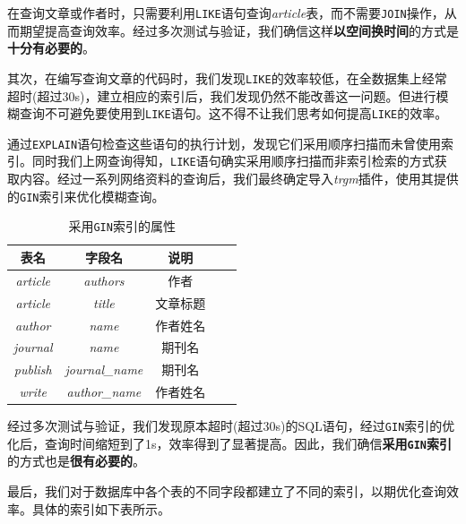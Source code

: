 \documentclass[UTF8,openany]{ctexbook}
\begin{document}
在查询文章或作者时，只需要利用\texttt{LIKE}语句查询\textit{article}表，而不需要\texttt{JOIN}操作，从而期望提高查询效率。经过多次测试与验证，我们确信这样\textbf{以空间换时间}的方式是\textbf{十分有必要的}。

其次，在编写查询文章的代码时，我们发现\texttt{LIKE}的效率较低，在全数据集上经常超时(超过30s)，建立相应的索引后，我们发现仍然不能改善这一问题。但进行模糊查询不可避免要使用到\texttt{LIKE}语句。这不得不让我们思考如何提高\texttt{LIKE}的效率。

通过\texttt{EXPLAIN}语句检查这些语句的执行计划，发现它们采用顺序扫描而未曾使用索引。同时我们上网查询得知，\texttt{LIKE}语句确实采用顺序扫描而非索引检索的方式获取内容。经过一系列网络资料的查询后，我们最终确定导入\textit{trgm}插件，使用其提供的\texttt{GIN}索引来优化模糊查询。

\begin{table}[H]
    \centering
    \begin{tabular}{|c|c|c|c|c|}
        \hline
        \textbf{表名} & \textbf{字段名} & \textbf{说明} \\
        \hline
        \textit{article} & \textit{authors} & 作者 \\
        \hline
        \textit{article} & \textit{title} & 文章标题 \\
        \hline
        \textit{author} & \textit{name} & 作者姓名 \\
        \hline
        \textit{journal} & \textit{name} & 期刊名 \\
        \hline
        \textit{publish} & \textit{journal\_name} & 期刊名 \\
        \hline
        \textit{write} & \textit{author\_name} & 作者姓名 \\
        \hline
    \end{tabular}
    \caption{采用\texttt{GIN}索引的属性}
\end{table}

经过多次测试与验证，我们发现原本超时(超过30s)的SQL语句，经过\texttt{GIN}索引的优化后，查询时间缩短到了1s，效率得到了显著提高。因此，我们确信\textbf{采用\texttt{GIN}索引}的方式也是\textbf{很有必要的}。

最后，我们对于数据库中各个表的不同字段都建立了不同的索引，以期优化查询效率。具体的索引如下表所示。
\end{document}
